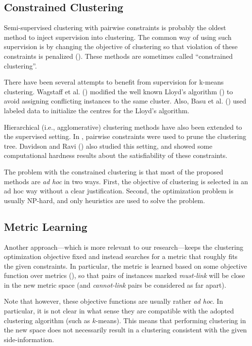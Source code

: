 \documentclass[letterpaper,12pt,titlepage,oneside,final]{book}
\begin{document}
\subsection{Constrained Clustering}

Semi-supervised clustering with pairwise constraints is probably the oldest method to inject supervision into clustering. The common way of using such supervision is by changing the objective of clustering so that violation of these constraints is penalized (\cite{demiriz1999semi,law2005model, basu2008constrained}). These methods are sometimes called ``constrained clustering''.

There have been several attempts to benefit from supervision for k-means clustering. Wagstaff et al. (\cite{wagstaff2001constrained}) modified the well known Lloyd's algorithm (\cite{lloyd1982least}) to avoid assigning conflicting instances to the same cluster. Also, Basu et al. (\cite{basu2002semi}) used labeled data to initialize the centres for the Lloyd's algorithm.

Hierarchical (i.e., agglomerative) clustering methods have also been extended to the supervised setting. In \cite{michel2012supervised}, pairwise constraints were used to prune the clustering tree. Davidson and Ravi (\cite{davidson2005agglomerative}) also studied this setting, and showed some computational hardness results about the satisfiability of these constraints.

The problem with the constrained clustering is that most of the proposed methods are \emph{ad hoc} in two ways. First, the objective of clustering is selected in an ad hoc way without a clear justification. Second, the optimization problem is usually NP-hard, and only heuristics are used to solve the problem.


\subsection{Metric Learning}

Another approach---which is more relevant to our research---keeps the clustering optimization objective fixed and instead searches for a metric that roughly fits the given constraints. In particular, the metric is learned based on some objective function over metrics (\cite{xing2002distance, alipanahi2008distance,tang2007enhancing}), so that pairs of instances marked \emph{must-link} will be close in the new metric space (and \emph{cannot-link} pairs be considered as far apart).

Note that however, these objective functions are usually rather \emph{ad hoc}. In particular, it is not clear in what sense they are compatible with the adopted clustering algorithm (such as $k$-means). This means that performing clustering in the new space does not necessarily result in a clustering consistent with the given side-information.
\end{document}
